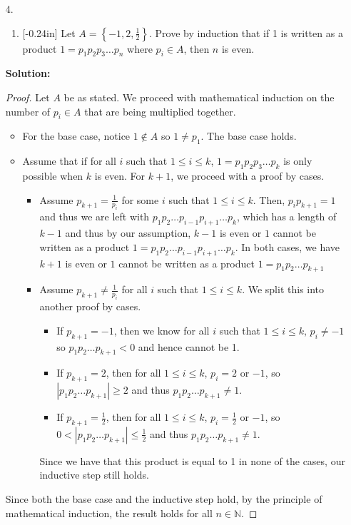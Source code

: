 \documentclass[letterpaper,12pt]{article}
\newcommand{\set}[1]{\left\{ #1 \right\}}
\theoremstyle{definition}
\begin{document}
\begin{enumerate}
    \item[4.]
 \begin{enumerate}
     \item  \reversemarginpar{}[-0.24in] 
 Let $A = \set{-1, 2, \frac{1}{2}}$. Prove by induction that if 1 is written as a product $1=p_1p_2p_3\ldots p_n$ where $p_i \in A$, then $n$ is even. 
 \end{enumerate}
 \begin{mdframed}
     \textbf{Solution:}
     \begin{proof}
         Let $A$ be as stated. We proceed with mathematical induction on the number of $p_i \in A$ that are being multiplied together. \begin{itemize}
             \item For the base case, notice $1 \notin A$ so $1 \neq p_1$. The base case holds.
             \item Assume that if for all $i$ such that $1 \leq i \leq k$, $1=p_1p_2p_3\ldots p_k$ is only possible when $k$ is even. For $k +1$, we proceed with a proof by cases.
             \begin{itemize}
                 \item Assume $p_{k+1} = \frac{1}{p_i}$ for some $i$ such that $1 \leq i \leq k$. Then, $p_i p_{k+1} = 1$ and thus we are left with $p_1p_2 \ldots p_{i-1}p_{i+1} \ldots p_k$, which has a length of $k-1$ and thus by our assumption, $k-1$ is even or $1$ cannot be written as a product $1 = p_1p_2 \ldots p_{i-1}p_{i+1} \ldots p_k$. In both cases, we have $k+1$ is even or $1$ cannot be written as a product $1 = p_1p_2 \ldots p_{k+1}$
                 \item Assume $p_{k+1} \neq \frac{1}{p_i}$ for all $i$ such that $1 \leq i \leq k$. We split this into another proof by cases. \begin{itemize}
                     \item If $p_{k+1} = -1$, then we know for all $i$ such that $1 \leq i \leq k$, $p_i \neq -1$ so $p_1p_2 \ldots p_{k+1} < 0$ and hence cannot be 1.
                     \item If $p_{k+1} =2$, then for all $1 \leq i \leq k$, $p_{i} = 2$ or $-1$, so $|p_1 p_2 \ldots p_{k+1}| \geq 2$ and thus $p_1 p_2 \ldots p_{k+1} \neq 1$. 
                     \item If $p_{k+1} = \frac{1}{2}$, then for all $1 \leq i \leq k$, $p_{i} = \frac{1}{2}$ or $-1$, so $0 < |p_1 p_2 \ldots p_{k+1}| \leq \frac{1}{2}$ and thus $p_1 p_2 \ldots p_{k+1} \neq 1$. 
                 \end{itemize}
                Since we have that this product is equal to 1 in none of the cases, our inductive step still holds.
             \end{itemize}
         \end{itemize}
         Since both the base case and the inductive step hold, by the principle of mathematical induction, the result holds for all $n \in \mathbb{N}$.
     \end{proof}
 \end{mdframed}
\end{enumerate}
\end{document}
